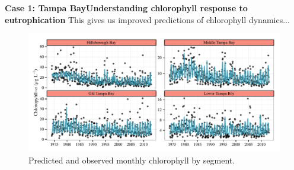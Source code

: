 \documentclass[serif]{beamer}\usepackage[]{graphicx}\usepackage[]{color}
\begin{document}
\begin{frame}{\textbf{Case 1: Tampa Bay}}{\textbf{Understanding chlorophyll response to eutrophication}}
This gives us improved predictions of chlorophyll dynamics...
\begin{figure}[!ht]


{\centering \includegraphics[width=\linewidth]{fig//predvals} 

}

\caption[Predicted and observed monthly chlorophyll by segment]{Predicted and observed monthly chlorophyll by segment.\label{fig:/predvals}}
\end{figure}


\end{frame}
\end{document}
